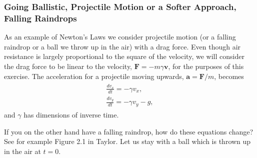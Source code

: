 \documentclass[letterpaper,10pt,english]{sphinxmanual}
\begin{document}
\subsubsection{Going Ballistic, Projectile Motion or a Softer Approach, Falling Raindrops}
\label{\detokenize{chapter3:going-ballistic-projectile-motion-or-a-softer-approach-falling-raindrops}}
As an example of Newton’s Laws we consider projectile motion (or a
falling raindrop or a ball we throw up in the air) with a drag force. Even though air resistance is
largely proportional to the square of the velocity, we will consider
the drag force to be linear to the velocity, \(\boldsymbol{F}=-m\gamma\boldsymbol{v}\),
for the purposes of this exercise. The acceleration for a projectile moving upwards,
\(\boldsymbol{a}=\boldsymbol{F}/m\), becomes
\begin{equation*}
\begin{split}
\begin{eqnarray}
\frac{dv_x}{dt}=-\gamma v_x,\\
\nonumber
\frac{dv_y}{dt}=-\gamma v_y-g,
\end{eqnarray}
\end{split}
\end{equation*}
and \(\gamma\) has dimensions of inverse time.

If you on the other hand have a falling raindrop, how do these equations change? See for example Figure 2.1 in Taylor.
Let us stay with a ball which is thrown up in the air at \(t=0\).
\end{document}
